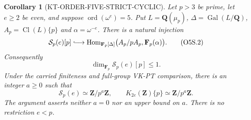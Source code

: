 \documentclass[11pt,a4paper]{article}
\newtheorem{corollary}[theorem]{Corollary}
\theoremstyle{definition}
\begin{document}
\begin{corollary}[KT-ORDER-FIVE-STRICT-CYCLIC]
Let $p>3$ be prime, let $e\ge2$ be even, and suppose
$\operatorname{ord}(\omega^e)=5$.
Put $L=\mathbf Q(\mu_p)$, $\Delta=\operatorname{Gal}(L/\mathbf Q)$,
$A_p=\operatorname{Cl}(L)\{p\}$ and $\alpha=\omega^{-e}$.
There is a natural injection
\[
 \mathcal S_p(e)[p]\lhook\joinrel\longrightarrow
 \operatorname{Hom}_{\mathbf F_p[\Delta]}
       \bigl(A_p/pA_p,\mathbf F_p(\alpha)\bigr).
 \tag{O5S.2}
\]
Consequently
\[
            \dim_{\mathbf F_p}\mathcal S_p(e)[p]\le1.
 \tag{O5S.3}
\]
Under the carried finiteness and full-group VK-PT comparison,
there is an integer $a\ge0$ such that
\[
 \mathcal S_p(e)\simeq\mathbf Z/p^a\mathbf Z,
 \qquad K_{2e}(\mathbf Z)\{p\}\simeq\mathbf Z/p^a\mathbf Z.
 \tag{O5S.4}
\]
The argument asserts neither $a=0$ nor an upper bound on $a$.
There is no restriction $e<p$.
\end{corollary}
\end{document}
